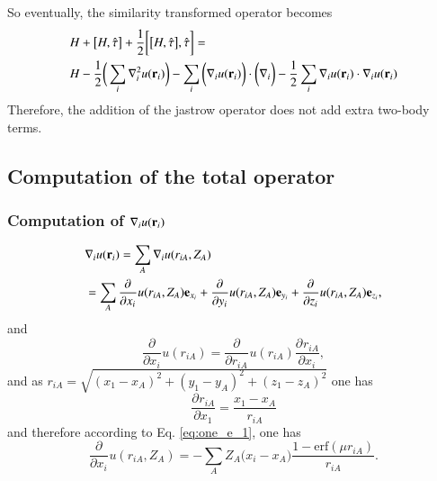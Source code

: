 \documentclass[aip,jcp,reprint,noshowkeys,superscriptaddress]{revtex4-1}
\newcommand{\deriv}[3]{\frac{\partial^{#3} #1}{\partial {#2}^{#3}}}
\newcommand{\br}[0]{{\bf {r}}}
\begin{document}
So eventually, the similarity transformed operator becomes 
\begin{equation}
 \begin{aligned}
& H + \big[ H,\hat{\tau} \big] + \frac{1}{2} \bigg[ \big[H,\hat{\tau}\big],\hat{\tau}\bigg] = \\ & H -\frac{1}{2} \bigg( \sum_i \nabla^2_i u(\br{}_i) \bigg)    
                                                                   -\sum_i \bigg(\nabla_i u(\br{}_i) \bigg) \cdot \bigg( \nabla_i  \bigg)  
                                                                   -\frac{1}{2}\sum_i \nabla_i u({\bf r}_i) \cdot \nabla_i u({\bf r}_i) 
 \end{aligned}
\end{equation}
Therefore, the addition of the jastrow operator does not add extra two-body terms. 
\subsection{Computation of the total operator}
\subsubsection{Computation of $\nabla_i u(\br{}_i)$}
\begin{equation}
 \begin{aligned}
&\nabla_i u(\br{}_i) = \sum_A \nabla_i u(r_{iA},Z_A) \\
                    &= \sum_A \deriv{}{x_i}{} u(r_{iA},Z_A) {\bf e}_{x_i} + \deriv{}{y_i}{} u(r_{iA},Z_A) {\bf e}_{y_i} + \deriv{}{z_i}{} u(r_{iA},Z_A) {\bf e}_{z_i}, 
 \end{aligned}
\end{equation}
and 
\begin{equation}
 \deriv{}{x_i}{}u(r_{iA}) = \deriv{}{r_{iA}}{}u(r_{iA}) \deriv{r_{iA}}{x_i}{},
\end{equation}
and as $r_{iA} = \sqrt{(x_1 - x_A)^2 + (y_1 - y_A)^2 + (z_1 - z_A)^2} $ 
one has                                                              
\begin{equation}
 \deriv{r_{iA}}{x_1}{} = \frac{x_1 - x_A}{r_{iA}}
\end{equation}
and therefore according to Eq. \eqref{eq:one_e_1}, one has 
\begin{equation}
 \deriv{}{x_i}{} u(r_{iA},Z_A) = -\sum_A Z_A \big( x_i - x_A \big) \frac{1 - \text{erf}(\mu r_{iA})}{r_{iA}}.
\end{equation}
\end{document}
